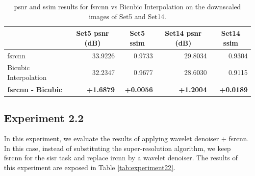 \begin{table}[]
	\centering
	\begin{tabular}{|l|r|r|r|r|}
		\hline
		\rowcolor[HTML]{EFEFEF}
		\multicolumn{1}{|c}{\cellcolor[HTML]{EFEFEF}\textbf{Method}} &
		\multicolumn{1}{c|}{\cellcolor[HTML]{EFEFEF}\textbf{Set5 \gls{psnr} (dB)}} & \multicolumn{1}{c|}{\cellcolor[HTML]{EFEFEF}\textbf{Set5 \gls{ssim}}} & \multicolumn{1}{c|}{\cellcolor[HTML]{EFEFEF}\textbf{Set14 \gls{psnr} (dB)}} & \multicolumn{1}{c|}{\cellcolor[HTML]{EFEFEF}\textbf{Set14 \gls{ssim}}} \\ \hline
		\rowcolor[HTML]{FFFFFF} 
		\gls{fsrcnn} & 33.9226 & 0.9733 & 29.8034 & 0.9304\\
		\rowcolor[HTML]{EFEFEF} 
		Bicubic Interpolation & 32.2347 & 0.9677 & 28.6030 & 0.9115\\\hline
		\textbf{\gls{fsrcnn} - Bicubic} & \textbf{+1.6879} & \textbf{+0.0056} & \textbf{+1.2004} & \textbf{+0.0189}\\\hline
	\end{tabular}
	\caption{\gls{psnr} and \gls{ssim} results for \gls{fsrcnn} vs Bicubic Interpolation on the downscaled images of Set5 and Set14.}
	\label{tab:experiment}
\end{table}

\subsection{Experiment 2.2}
In this experiment, we evaluate the results of applying wavelet denoiser $+$ \gls{fsrcnn}. In this case, instead of substituting the super-resolution algorithm, we keep \gls{fsrcnn} for the \gls{sisr} task and replace \gls{ircnn} by a wavelet denoiser. The results of this experiment are exposed in Table \ref{tab:experiment22}.

